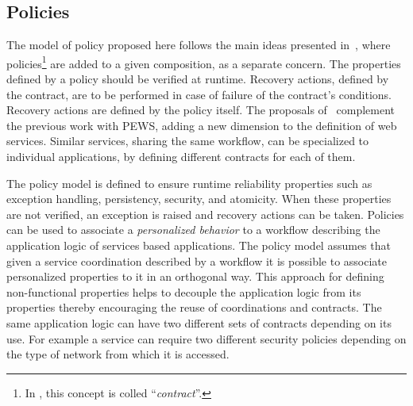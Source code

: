 \documentclass{sig-alternate}
\begin{document}
\subsection{Policies} \label{sec:contract-model}


%  

The model of policy proposed here follows the main ideas presented
in~\cite{Espinosa-OviedoVZC09, PortillaHE08}, where policies\footnote{In
\cite{PortillaHE08}, this concept is colled ``\textit{contract}''.} are added to
a given composition, as a separate concern. The properties defined by a policy
should be verified at runtime. Recovery actions, defined by the contract, are to
be performed in case of failure of the contract's conditions. Recovery actions
are defined by the policy itself. The proposals of~\cite{Espinosa-OviedoVZC09,
PortillaHE08} complement the previous work with PEWS, adding a new dimension to
the definition of web services. Similar services, sharing the same workflow, can
be specialized to individual applications, by defining different contracts for
each of them.


The policy model is defined to ensure runtime reliability  properties such as
exception handling, persistency, security, and atomicity. When these properties
are not verified, an exception is raised and recovery actions can be taken.
Policies can be used to associate a \textit{personalized behavior} to a workflow
describing the application logic of services based applications. The policy
model assumes that given a service coordination described by a workflow it is
possible to associate personalized properties to it in an orthogonal way. This
approach for defining non-functional properties helps to decouple the
application logic from its properties thereby encouraging the reuse of
coordinations and contracts. The same application logic can have two different
sets of contracts depending on its use. For example a service can require two
different security policies depending on the type of network from which it is
accessed.
\end{document}
